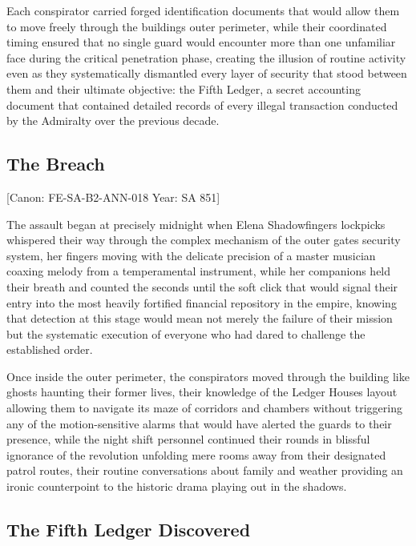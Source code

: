Each conspirator carried forged identification documents that would
allow them to move freely through the building\textquotesingle s outer
perimeter, while their coordinated timing ensured that no single guard
would encounter more than one unfamiliar face during the critical
penetration phase, creating the illusion of routine activity even as
they systematically dismantled every layer of security that stood
between them and their ultimate objective: the Fifth Ledger, a secret
accounting document that contained detailed records of every illegal
transaction conducted by the Admiralty over the previous decade.

\subsection{The Breach}\label{the-breach}

{[}Canon: FE-SA-B2-ANN-018 \textbar{} Year: SA 851{]}

The assault began at precisely midnight when Elena
Shadowfinger\textquotesingle s lockpicks whispered their way through the
complex mechanism of the outer gate\textquotesingle s security system,
her fingers moving with the delicate precision of a master musician
coaxing melody from a temperamental instrument, while her companions
held their breath and counted the seconds until the soft click that
would signal their entry into the most heavily fortified financial
repository in the empire, knowing that detection at this stage would
mean not merely the failure of their mission but the systematic
execution of everyone who had dared to challenge the established order.

Once inside the outer perimeter, the conspirators moved through the
building like ghosts haunting their former lives, their knowledge of the
Ledger House\textquotesingle s layout allowing them to navigate its maze
of corridors and chambers without triggering any of the motion-sensitive
alarms that would have alerted the guards to their presence, while the
night shift personnel continued their rounds in blissful ignorance of
the revolution unfolding mere rooms away from their designated patrol
routes, their routine conversations about family and weather providing
an ironic counterpoint to the historic drama playing out in the shadows.

\subsection{The Fifth Ledger
Discovered}\label{the-fifth-ledger-discovered}

